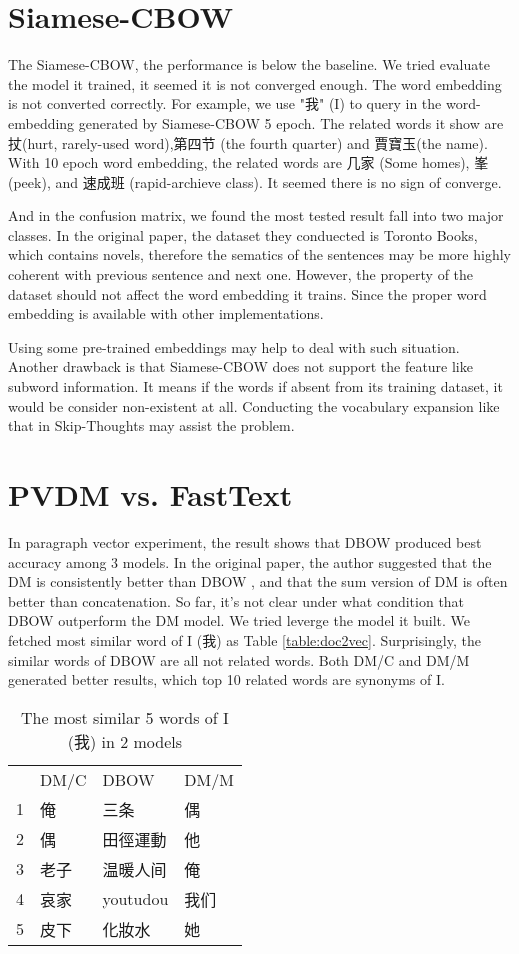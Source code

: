 \section{Siamese-CBOW}

The Siamese-CBOW, the performance is below the baseline. We tried evaluate the model it trained, it seemed it is not converged enough. 
The word embedding is not converted correctly. For example, we use "我" (I) to query in the word-embedding generated by Siamese-CBOW 5 epoch. 
The related words it show are 扙(hurt, rarely-used word),第四节 (the fourth quarter) and 賈寶玉(the name). With 10 epoch word embedding, the  
related words are 几家 (Some homes), 峯(peek), and 速成班 (rapid-archieve class). It seemed there is no sign of converge.

And in the confusion matrix, we found the most tested result fall into two major classes.
In the original paper, the dataset they conduected is Toronto Books, which contains novels,
 therefore the sematics of the sentences may be more highly coherent with previous sentence and next one. 
However, the property of the dataset should not affect the word embedding it trains. Since the proper word embedding is available with other implementations.

Using some pre-trained embeddings may help to deal with such situation. Another drawback is that Siamese-CBOW does not support the feature like subword information.
It means if the words if absent from its training dataset, it would be consider non-existent at all. Conducting the vocabulary expansion like that in Skip-Thoughts may assist the problem.


\section{PVDM vs. FastText}

In paragraph vector experiment, the result shows that DBOW produced best accuracy among 3 models. In the original paper, the author suggested that the DM is consistently better than DBOW
, and that the sum version of DM is often better than concatenation. 
So far, it's not clear under what condition that DBOW outperform the DM model. We tried leverge the model it built. 
We fetched most similar word of I (我) as Table \ref{table:doc2vec}. Surprisingly, the similar words of DBOW are all not related words. 
Both DM/C and DM/M generated better results, which top 10 related words are synonyms of I.

\begin{table}[]
\centering
\caption{The most similar 5 words of I (我) in 2 models}
\label{doc2vec}
\begin{tabular}{llll}
      & DM/C & DBOW & DM/M \\
1 & 俺 &  三条  & 偶\\
2 & 偶  & 田徑運動 & 他\\
3 & 老子  & 温暖人间 & 俺\\
4 & 哀家  & youtudou & 我们\\
5 & 皮下  & 化妝水 & 她
\end{tabular}
\end{table}

